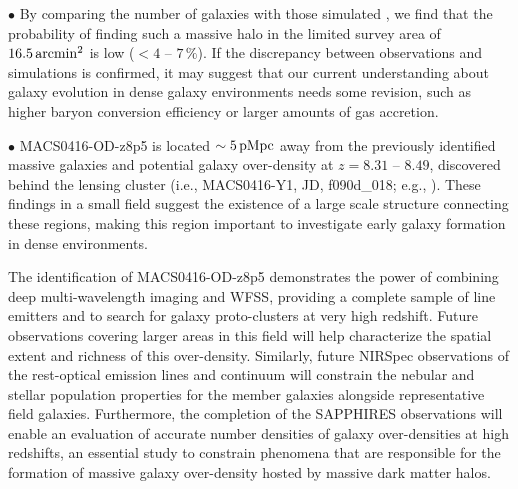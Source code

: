 \documentclass[twocolumn]{aastex631}
\begin{document}
\noindent $\bullet$ By comparing the number of galaxies with those simulated \citep{Behroozi2019}, we find that the probability of finding such a massive halo in the limited survey area of $16.5\,{\rm arcmin^2}$ is low ($<4$ -- $7\,\%$). If the discrepancy between observations and simulations is confirmed, it may suggest that our current understanding about galaxy evolution in dense galaxy environments needs some revision, such as higher baryon conversion efficiency or larger amounts of gas accretion.
\vspace{0.2cm}

\noindent  $\bullet$ MACS0416-OD-z8p5 is located $\sim5\,{\rm pMpc}$ away from the previously identified massive galaxies and potential galaxy over-density at $z=8.31$ -- $8.49$, discovered behind the lensing cluster (i.e., MACS0416-Y1, JD, f090d\_018; e.g., \citealt{Tamura2019,Li2023,Ma2024}). These findings in a small field suggest the existence of a large scale structure connecting these regions, making this region important to investigate early galaxy formation in dense environments.
\vspace{0.2cm}

The identification of MACS0416-OD-z8p5 demonstrates the power of combining deep multi-wavelength imaging and WFSS, providing a complete sample of line emitters and to search for galaxy proto-clusters at very high redshift. 
Future observations covering larger areas in this field will help characterize the spatial extent and richness of this over-density. Similarly, future NIRSpec observations of the rest-optical emission lines and continuum will constrain the nebular and stellar population properties for the member galaxies alongside representative field galaxies. Furthermore, the completion of the SAPPHIRES observations will enable an evaluation of accurate number densities of galaxy over-densities at high redshifts, an essential study to constrain phenomena that are responsible for the formation of massive galaxy over-density hosted by massive dark matter halos.
\end{document}
